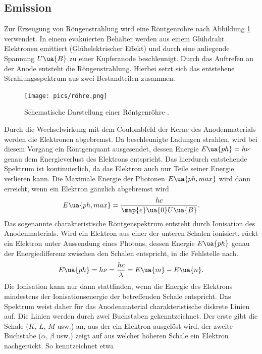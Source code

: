 \subsection{Emission}
Zur Erzeugung von Röngenstrahlung wird eine Röntgenröhre nach Abbildung \ref{fig: röhre} verwendet. In einem
evakuierten Behälter werden aus einem Glühdraht Elektronen emittiert (Glühelektrischer Effekt) und durch eine
anliegende Spannung $U\ua{B}$ zu einer Kupferanode beschleunigt. Durch das Auftrefen an der Anode
entsteht die Röngenstrahlung. Hierbei setzt sich das entstehene Strahlungsspektrum aus zwei
Bestandteilen zusammen.\\
\begin{figure}
  \centering
  \texttt{[image: pics/röhre.png]}
  \caption{Schematische Darstellung einer Röntgenröhre \cite{anleitung602i}.}
  \label{fig: röhre}
\end{figure}
Durch die Wechselwirkung mit dem Coulombfeld der Kerne des Anodenmaterials werden die Elektronen abgebremst. Da beschleunigte Ladungen strahlen, wird bei diesem
Vorgang ein Röntgenquant ausgesendet, dessen Energie $E\ua{ph} = h\nu$ genau dem Energieverlust des Elektrons
entspricht. Das hierdurch entstehende Spektrum ist kontinuierlich, da das Elektron auch nur Teile seiner
Energie verlieren kann. Die Maximale Energie der Photonen $E\ua{ph, max}$ wird dann erreicht,
wenn ein Elektron gänzlich abgebremst wird
\begin{equation}
  E\ua{ph, max} = \frac{h c}{\map{e}\ua{0}U\ua{B}}.
  \label{eq: E_max}
\end{equation}
Das sogenannte charakteristische Röntgenspektrum entsteht durch Ionisation des Anodenmaterials.
Wird ein Elektron aus einer der unteren Schalen ionisiert, rückt ein Elektron unter Aussendung eines
Photons, dessen Energie $E\ua{ph}$ genau der Energiedifferenz zwischen den Schalen entspricht, in die Fehlstelle nach.
\begin{equation}
  E\ua{ph} = h\nu = \frac{h c}{\lambda} = E\ua{m} - E\ua{n}.
  \label{eq: photonenenergie}
\end{equation}
Die Ionisation kann nur dann stattfinden, wenn die Energie des Elektrons mindestens der Ionisationsenergie der betreffenden Schale entspricht.
Das Spektrum weist daher für das Anodenmaterial charakteristische diskrete Linien auf. Die Linien werden durch zwei Buchstaben
gekenntzeichnet. Der erste gibt die Schale ($K$, $L$, $M$ usw.) an, aus der ein Elektron ausgelöst wird, der zweite Buchstabe
($\alpha$, $\beta$ usw.) zeigt auf aus welcher höheren Schale ein Elektron nachgerückt. So kenntzeichnet etwa
